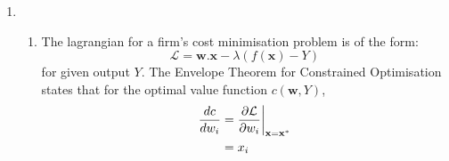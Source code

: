 \documentclass{article}
\newcommand{\Lagr}{\mathcal{L}}
\begin{document}
\begin{enumerate}
        \item \begin{enumerate}
            \item The lagrangian for a firm's cost minimisation problem is of the form:
            $$\Lagr = \mathbf{w}.\mathbf{x} - \lambda(f(\mathbf{x}) - Y)$$
            for given output $Y$. The Envelope Theorem for Constrained Optimisation states that for the optimal value function $c(\mathbf{w},Y)$,
            \begin{align*}
                \frac{dc}{dw_i} &= \pdv{\Lagr}{w_i}  \bigg\rvert_{\mathbf{x}=\mathbf{x}^*} \\
                &= x_i
            \end{align*}
        \end{enumerate}
    \end{enumerate}
\end{document}
